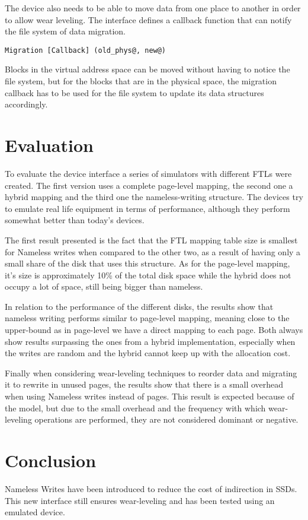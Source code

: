 \documentclass[twocolumn,a4paper,10pt]{article}
\begin{document}
The device also needs to be able to move data from one place to another in
order to allow wear leveling. The interface defines a callback function that
can notify the file system of data migration.
\begin{lstlisting}
Migration [Callback] (old_phys@, new@)
\end{lstlisting}
Blocks in the virtual address space can be moved without having to notice the
file system, but for the blocks that are in the physical space, the migration
callback has to be used for the file system to update its data structures
accordingly.

\section*{Evaluation}
To evaluate the device interface a series of simulators with different FTLs
were created. The first version uses a complete page-level mapping, the second
one a hybrid mapping and the third one the nameless-writing structure. The
devices try to emulate real life equipment in terms of performance, although
they perform somewhat better than today’s devices.

The first result presented is the fact that the FTL mapping table size is
smallest for Nameless writes when compared to the other two, as a result of
having only a small share of the disk that uses this structure. As for the
page-level mapping, it’s size is approximately 10\% of the total disk space
while the hybrid does not occupy a lot of space, still being bigger than
nameless.

In relation to the performance of the different disks, the results show that
nameless writing performs similar to page-level mapping, meaning close to the
upper-bound as in page-level we have a direct mapping to each page. Both
always show results surpassing the ones from a hybrid implementation,
especially when the writes are random and the hybrid cannot keep up with the
allocation cost.

Finally when considering wear-leveling techniques to reorder data and
migrating it to rewrite in unused pages, the results show that there is a
small overhead when using Nameless writes instead of pages. This result is
expected because of the model, but due to the small overhead and the frequency
with which wear-leveling operations are performed, they are not considered
dominant or negative.

\section*{Conclusion}
Nameless Writes have been introduced to reduce the cost of indirection in
SSDs. This new interface still ensures wear-leveling and has been tested using
an emulated device.
\end{document}
